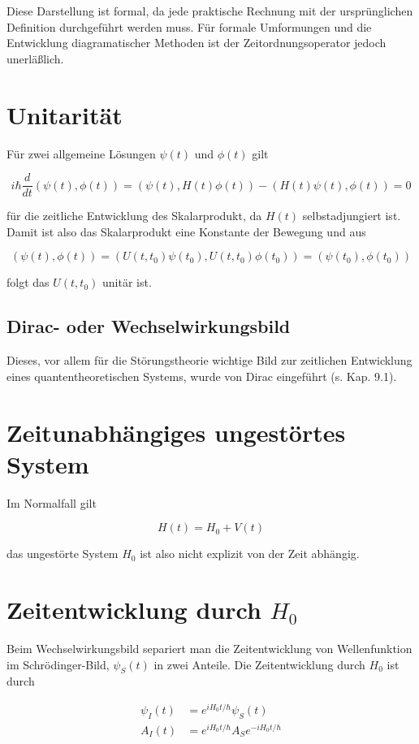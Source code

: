 \documentclass[10pt, letterpaper]{article}
\begin{document}
Diese Darstellung ist formal, da jede praktische Rechnung mit der ursprünglichen Definition durchgeführt werden muss. Für formale Umformungen und die Entwicklung diagramatischer Methoden ist der Zeitordnungsoperator jedoch unerläßlich.

\section*{Unitarität}
Für zwei allgemeine Lösungen $\psi(t)$ und $\phi(t)$ gilt

$$
i \hbar \frac{d}{d t}(\psi(t), \phi(t))=(\psi(t), H(t) \phi(t))-(H(t) \psi(t), \phi(t))=0
$$

für die zeitliche Entwicklung des Skalarprodukt, da $H(t)$ selbstadjungiert ist. Damit ist also das Skalarprodukt eine Konstante der Bewegung und aus

$$
(\psi(t), \phi(t))=\left(U\left(t, t_{0}\right) \psi\left(t_{0}\right), U\left(t, t_{0}\right) \phi\left(t_{0}\right)\right)=\left(\psi\left(t_{0}\right), \phi\left(t_{0}\right)\right)
$$

folgt das $U\left(t, t_{0}\right)$ unitär ist.

\subsection*{Dirac- oder Wechselwirkungsbild}
Dieses, vor allem für die Störungstheorie wichtige Bild zur zeitlichen Entwicklung eines quantentheoretischen Systems, wurde von Dirac eingeführt (s. Kap. 9.1).

\section*{Zeitunabhängiges ungestörtes System}
Im Normalfall gilt

$$
H(t)=H_{0}+V(t)
$$

das ungestörte System $H_{0}$ ist also nicht explizit von der Zeit abhängig.

\section*{Zeitentwicklung durch $H_{0}$}
Beim Wechselwirkungsbild separiert man die Zeitentwicklung von Wellenfunktion im Schrödinger-Bild, $\psi_{S}(t)$ in zwei Anteile. Die Zeitentwicklung durch $H_{0}$ ist durch

$$
\begin{aligned}
\psi_{I}(t) & =e^{i H_{0} t / \hbar} \psi_{S}(t) \\
A_{I}(t) & =e^{i H_{0} t / \hbar} A_{S} e^{-i H_{0} t / \hbar}
\end{aligned}
$$
\end{document}
